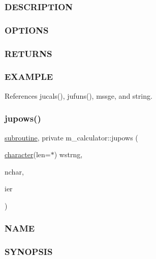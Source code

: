 \subsubsection*{D\+E\+S\+C\+R\+I\+P\+T\+I\+ON}

\subsubsection*{O\+P\+T\+I\+O\+NS}

\subsubsection*{R\+E\+T\+U\+R\+NS}

\subsubsection*{E\+X\+A\+M\+P\+LE}

References jucals(), jufuns(), mssge, and string.

\mbox{\label{namespacem__calculator_ae1afc2ee970ad4635cce19b9b8b74f1c}} 
\subsubsection{\texorpdfstring{jupows()}{jupows()}}
{\footnotesize\ttfamily \hyperlink{M__stopwatch_83_8txt_acfbcff50169d691ff02d4a123ed70482}{subroutine}, private m\+\_\+calculator\+::jupows (\begin{DoxyParamCaption}\item[{\hyperlink{option__stopwatch_83_8txt_abd4b21fbbd175834027b5224bfe97e66}{character}(len=$\ast$)}]{wstrng,  }\item[{}]{nchar,  }\item[{}]{ier }\end{DoxyParamCaption})\hspace{0.3cm}{\ttfamily [private]}}



\subsubsection*{N\+A\+ME}

\subsubsection*{S\+Y\+N\+O\+P\+S\+IS}

